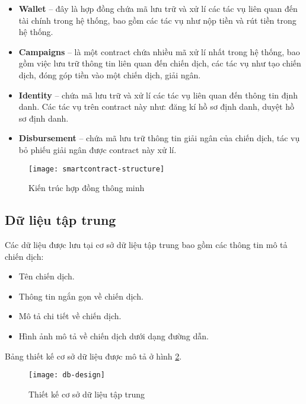 \documentclass[../main-report.tex]{subfiles}
\begin{document}
\begin{itemize}
\item \textbf{Wallet} -- đây là hợp đồng chứa mã lưu trữ và xử lí các tác vụ liên quan đến tài chính trong hệ thống, bao gồm các tác vụ như nộp tiền và rút tiền trong hệ thống.
\item \textbf{Campaigns} -- là một contract chứa nhiều mã xử lí nhất trong hệ thống, bao gồm việc lưu trữ thông tin liên quan đến chiến dịch, các tác vụ như tạo chiến dịch, đóng góp tiền vào một chiến dịch, giải ngân.
\item \textbf{Identity} -- chứa mã lưu trữ và xử lí các tác vụ liên quan đến thông tin định danh. Các tác vụ trên contract này như: đăng kí hồ sơ định danh, duyệt hồ sơ định danh.
\item \textbf{Disbursement} -- chứa mã lưu trữ thông tin giải ngân của chiến dịch, tác vụ bỏ phiếu giải ngân được contract này xử lí. 
\end{itemize}

\begin{figure}[ht!]
\begin{center}
\label{fig:smartcontract-structure}
\texttt{[image: smartcontract-structure]}
\caption{Kiến trúc hợp đồng thông minh}
\end{center}
\end{figure}

\subsection{Dữ liệu tập trung}
Các dữ liệu được lưu tại cơ sở dữ liệu tập trung bao gồm các thông tin mô tả chiến dịch:

\begin{itemize}
\item Tên chiến dịch.
\item Thông tin ngắn gọn về chiến dịch.
\item Mô tả chi tiết về chiến dịch.
\item Hình ảnh mô tả về chiến dịch dưới dạng đường dẫn.
\end{itemize}

Bảng thiết kế cơ sở dữ liệu được mô tả ở hình \ref{fig:db-design}.

\begin{figure}[ht!]
\begin{center}
\label{fig:db-design}
\texttt{[image: db-design]}
\caption{Thiết kế cơ sở dữ liệu tập trung}
\end{center}
\end{figure}
\end{document}
